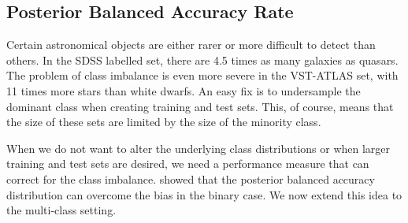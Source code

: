 \subsection{Posterior Balanced Accuracy Rate}
Certain astronomical objects are either rarer or more difficult to detect than others.
In the SDSS labelled set, there are 4.5 times as many galaxies as quasars. The problem
of class imbalance is even more severe in the VST-ATLAS set, with 11 times more stars than
white dwarfs. An easy fix is to undersample the dominant class when creating training and
test sets. This, of course, means that the size of these sets are limited by the size
of the minority class.

When we do not want to alter the underlying class distributions or when larger training and test
sets are desired, we need a performance measure that can correct for the class imbalance.
 showed that the posterior balanced accuracy distribution can overcome
the bias in the binary case. We now extend this idea to the multi-class setting.


